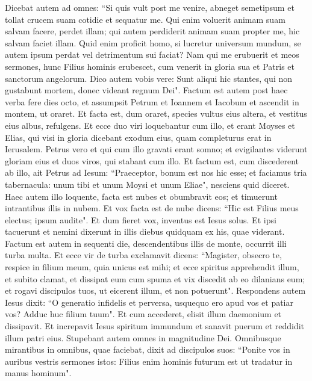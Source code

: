 \begin{biblechapter}
\verse Dicebat autem ad omnes: “Si quis vult post me venire, abneget semetipsum et tollat crucem suam cotidie et sequatur me. 
\verse Qui enim voluerit animam suam salvam facere, perdet illam; qui autem perdiderit animam suam propter me, hic salvam faciet illam. 
\verse Quid enim proficit homo, si lucretur universum mundum, se autem ipsum perdat vel detrimentum sui faciat? 
\verse Nam qui me erubuerit et meos sermones, hunc Filius hominis erubescet, cum venerit in gloria sua et Patris et sanctorum angelorum. 
\verse Dico autem vobis vere: Sunt aliqui hic stantes, qui non gustabunt mortem, donec videant regnum Dei". 
\verse Factum est autem post haec verba fere dies octo, et assumpsit Petrum et Ioannem et Iacobum et ascendit in montem, ut oraret. 
\verse Et facta est, dum oraret, species vultus eius altera, et vestitus eius albus, refulgens. 
\verse Et ecce duo viri loquebantur cum illo, et erant Moyses et Elias, 
\verse qui visi in gloria dicebant exodum eius, quam completurus erat in Ierusalem. 
\verse Petrus vero et qui cum illo gravati erant somno; et evigilantes viderunt gloriam eius et duos viros, qui stabant cum illo. 
\verse Et factum est, cum discederent ab illo, ait Petrus ad Iesum: “Praeceptor, bonum est nos hic esse; et faciamus tria tabernacula: unum tibi et unum Moysi et unum Eliae", nesciens quid diceret. 
\verse Haec autem illo loquente, facta est nubes et obumbravit eos; et timuerunt intrantibus illis in nubem. 
\verse Et vox facta est de nube dicens: “Hic est Filius meus electus; ipsum audite". 
\verse Et dum fieret vox, inventus est Iesus solus. Et ipsi tacuerunt et nemini dixerunt in illis diebus quidquam ex his, quae viderant. 
\verse Factum est autem in sequenti die, descendentibus illis de monte, occurrit illi turba multa. 
\verse Et ecce vir de turba exclamavit dicens: “Magister, obsecro te, respice in filium meum, quia unicus est mihi; 
\verse et ecce spiritus apprehendit illum, et subito clamat, et dissipat eum cum spuma et vix discedit ab eo dilanians eum; 
\verse et rogavi discipulos tuos, ut eicerent illum, et non potuerunt". 
\verse Respondens autem Iesus dixit: “O generatio infidelis et perversa, usquequo ero apud vos et patiar vos? Adduc huc filium tuum". 
\verse Et cum accederet, elisit illum daemonium et dissipavit. Et increpavit Iesus spiritum immundum et sanavit puerum et reddidit illum patri eius. 
\verse Stupebant autem omnes in magnitudine Dei. Omnibusque mirantibus in omnibus, quae faciebat, dixit ad discipulos suos:  
\verse “Ponite vos in auribus vestris sermones istos: Filius enim hominis futurum est ut tradatur in manus hominum". 

\end{biblechapter}
